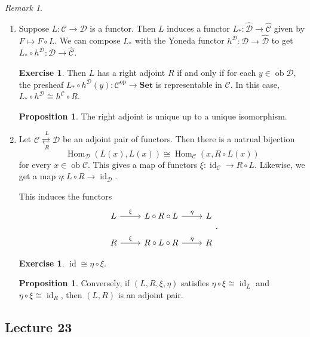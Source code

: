 \documentclass[10pt,letterpaper,cm]{nupset}
\theoremstyle{definition}
\theoremstyle{theorem}
\newtheorem{prop}[definition]{Proposition}
\newtheorem{exercise}[definition]{Exercise}
\theoremstyle{remark}
\newtheorem{remark}[definition]{Remark}
\newcommand{\1}{\mathbf{1}}
\renewcommand{\c}{\mathscr{C}}
\renewcommand{\d}{\mathscr{D}}
\newcommand{\0}{\vec 0}
\DeclareMathOperator{\id}{id}
\DeclareMathOperator{\op}{op}
\DeclareMathOperator{\ob}{ob}
\DeclareMathOperator{\Hom}{Hom}
\begin{document}
\begin{remark} $ $
\begin{enumerate}
\item Suppose $L : \c \to \d$ is a functor. Then $L$ induces a functor $L_{\ast} : \widehat{\d} \to \widehat{\c}$ given by $F \mapsto F \circ L$. We can compose $L_{\ast}$ with the Yoneda functor $h^{\d} : \d \to \widehat{\d}$ to get $L_{\ast} \circ h^{\d} : \d \to \widehat{\c}$. 
\begin{exercise} Then $L$ has a right adjoint $R$  if and only if for each $y \in \ob \d$, the presheaf $L_{\ast} \circ h^{\d}(y) : \c^{\op} \to \mathbf{Set}$ is representable in $\c$. In this case, $L_{\ast} \circ h^{\d} \cong h^{\c} \circ R$.
\end{exercise}
\begin{prop}
The right adjoint is unique up to a unique isomorphism.
\end{prop}
\item Let $\overset{L}{\underset{R}{\c \rightleftarrows \d}}$ be an adjoint pair of functors. Then there is a natrual bijection $$\Hom_{\d}(L(x), L(x)) \cong \Hom_{\c}(x, R \circ L(x))$$ for every $x\in \ob \c$. This gives a map of functors $\xi : \id_{\c} \to R \circ L$. Likewise, we get a map $\eta : L \circ R \to \id_{\d}$.

This induces the functors 
\[
\begin{tikzcd}
L \arrow[r, "\xi"] & L \circ R \circ L \arrow[r, "\eta"] & L \\
R \arrow[r, "\xi"] & R\circ L \circ R \arrow[r, "\eta"] & R
\end{tikzcd}
.\]
\begin{exercise}
$\id \cong \eta \circ \xi$.
\end{exercise}
\begin{prop}
Conversely, if $(L, R, \xi, \eta)$ satisfies $\eta \circ \xi \cong \id_L$ and $\eta \circ \xi \cong \id_R$, then $(L, R)$ is an adjoint pair.
\end{prop}
\end{enumerate}
\end{remark}

\subsection{Lecture 23}
\end{document}
